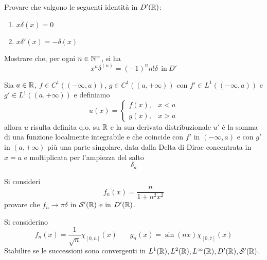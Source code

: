 \Esercizio{}

Provare che valgono le seguenti identità in $D'(\mathbb{R})$:
\begin{enumerate}
\item $x\delta (x) = 0$
\item $x\delta'(x) = - \delta (x)$
\end{enumerate}


Mostrare che, per ogni $n\in \mathbb{N}^{+}$, si ha
\begin{equation*}
\boxed{x^{n} \delta^{(n)} = (- 1)^{n} n!\delta \ \ \text{in} \ D'}
\end{equation*}


Sia $a\in \mathbb{R} $, $f\in C^{1}((- \infty, a))$, $g\in C^{1}((a, + \infty))$ con $f'\in L^{1}((- \infty, a))$ e $g'\in L^{1}((a, + \infty))$ e definiamo
\begin{equation*}
u(x) =
\begin{cases}
f(x), & x < a\\
g(x), & x > a
\end{cases}
\end{equation*}
allora $u$ risulta definita q.o. su $\mathbb{R} $ e la sua derivata distribuzionale $u'$ è la somma di una funzione localmente integrabile e che coincide con $f'$ in $(- \infty, a)$ e con $g'$ in $(a, + \infty)$ più una parte singolare, data dalla Delta di Dirac concentrata in $x = a$ e moltiplicata per l'ampiezza del salto
\begin{equation*}
[ u(a_{+}) - u(a_{-})] \delta_{a}
\end{equation*}

\Esercizio{}

Si consideri
\begin{equation*}
f_{n}(x) = \frac{n}{1 + n^{2} x^{2}}
\end{equation*}
provare che $f_{n}\rightarrow \pi \delta $ in $\mathcal{S}'(\mathbb{R})$ e in $D'(\mathbb{R})$.

\Esercizio{}

Si considerino
\begin{equation*}
f_{n}(x) = \frac{1}{\sqrt{n}} \chi_{[ 0, n]}(x) \ \ \ \ \ \ \ \ g_{n}(x) = \sin(nx) \chi_{[ 0, 7]}(x)
\end{equation*}
Stabilire se le successioni sono convergenti in $L^{1}(\mathbb{R}), L^{2}(\mathbb{R}), L^{\infty}(\mathbb{R}), D'(\mathbb{R}), \mathcal{S}'(\mathbb{R})$.

\Esercizio{}


